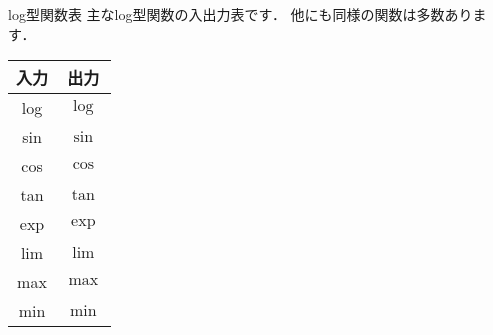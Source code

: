 \documentclass[slide,dvipdfmx]{beamer}
\newcommand{\bs}{\texttt{\symbol{"5C}}}
\begin{document}
\begin{frame}{log型関数表}
主なlog型関数の入出力表です．
他にも同様の関数は多数あります．
\begin{center}
\begin{tabular}{|c|c|} \hline
入力 & 出力 \\\hline
\bs log & $\log$ \\\hline
\bs sin & $\sin$ \\\hline
\bs cos & $\cos$ \\\hline
\bs tan & $\tan$ \\\hline
\bs exp & $\exp$ \\\hline
\bs lim & $\lim$ \\\hline
\bs max & $\max$ \\\hline
\bs min & $\min$ \\\hline
\end{tabular}
\end{center}
\end{frame}
\end{document}
